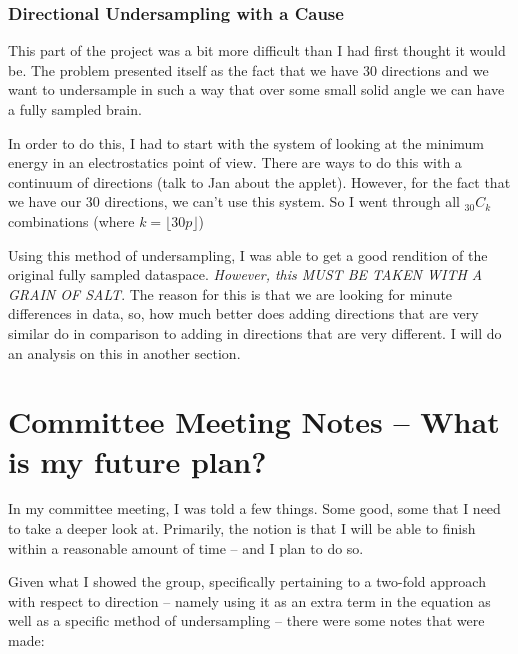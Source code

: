 \documentclass[11 pt]{article}
\let\oldsection\section
\renewcommand\section{\clearpage\newpage\oldsection}
\begin{document}
    \subsubsection{Directional Undersampling with a Cause}
      This part of the project was a bit more difficult than I had first thought it would be. The problem presented itself as the fact that we have 30 directions and we want to undersample in such a way that over some small solid angle we can have a fully sampled brain. 

      In order to do this, I had to start with the system of looking at the minimum energy in an electrostatics point of view. There are ways to do this with a continuum of directions (talk to Jan about the applet). However, for the fact that we have our 30 directions, we can't use this system. So I went through all $_{30}C_k$ combinations (where $k = \lfloor 30 p \rfloor$)
      
      Using this method of undersampling, I was able to get a good rendition of the original fully sampled dataspace. \emph{However, this MUST BE TAKEN WITH A GRAIN OF SALT}. The reason for this is that we are looking for minute differences in data, so, how much better does adding directions that are very similar do in comparison to adding in directions that are very different. I will do an analysis on this in another section.


\section{Committee Meeting Notes -- What is my future plan?}

  In my committee meeting, I was told a few things. Some good, some that I need to take a deeper look at. Primarily, the notion is that I will be able to finish within a reasonable amount of time -- and I plan to do so. 

  Given what I showed the group, specifically pertaining to a two-fold approach with respect to direction -- namely using it as an extra term in the equation as well as a specific method of undersampling -- there were some notes that were made:
\end{document}
